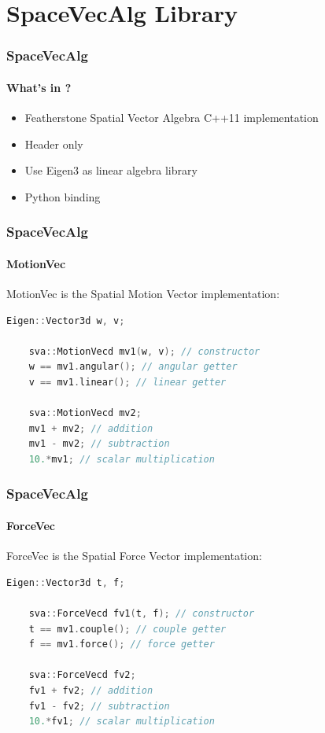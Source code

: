\documentclass{beamer}
\begin{document}
\section{SpaceVecAlg Library}

\begin{frame}
\frametitle{SpaceVecAlg}
\framesubtitle{What's in ?}
\begin{itemize}
	\item Featherstone Spatial Vector Algebra C++11 implementation
	\item Header only
	\item Use Eigen3 as linear algebra library
	\item Python binding
\end{itemize}
\end{frame}


\begin{frame}[fragile]
\frametitle{SpaceVecAlg}
\framesubtitle{MotionVec}
MotionVec is the Spatial Motion Vector implementation:
\begin{lstlisting}[language=C++]
	Eigen::Vector3d w, v;

	sva::MotionVecd mv1(w, v); // constructor
	w == mv1.angular(); // angular getter
	v == mv1.linear(); // linear getter

	sva::MotionVecd mv2;
	mv1 + mv2; // addition
	mv1 - mv2; // subtraction
	10.*mv1; // scalar multiplication
\end{lstlisting}
\end{frame}


\begin{frame}[fragile]
\frametitle{SpaceVecAlg}
\framesubtitle{ForceVec}
ForceVec is the Spatial Force Vector implementation:
\begin{lstlisting}[language=C++]
	Eigen::Vector3d t, f;

	sva::ForceVecd fv1(t, f); // constructor
	t == mv1.couple(); // couple getter
	f == mv1.force(); // force getter

	sva::ForceVecd fv2;
	fv1 + fv2; // addition
	fv1 - fv2; // subtraction
	10.*fv1; // scalar multiplication
\end{lstlisting}
\end{frame}
\end{document}
